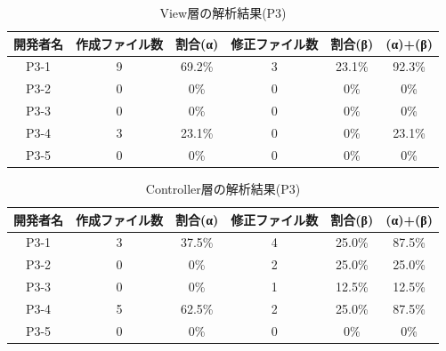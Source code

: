 \documentclass{funthesis}
\begin{document}
\begin{table}[H]
  \begin{center}
\begin{tabular}{|c|c|c|c|c||c|}\hline
開発者名&作成ファイル数&割合(α)&修正ファイル数&割合(β)&(α)+(β)\\ \hline
P3-1 & 9 & 69.2\% & 3 & 23.1\% & 92.3\%\\ \hline \hline
P3-2 & 0 & 0\% & 0 & 0\% & 0\%\\ \hline \hline
P3-3 & 0 & 0\% & 0 & 0\% & 0\%\\ \hline \hline
P3-4 & 3 & 23.1\% & 0 & 0\% & 23.1\%\\ \hline \hline
P3-5 & 0 & 0\% & 0 & 0\% & 0\%\\ \hline
\end{tabular}    
\caption{View層の解析結果(P3)}    \label{sample}
  \end{center}
\end{table}\begin{table}[H]
  \begin{center}
\begin{tabular}{|c|c|c|c|c||c|}\hline
開発者名&作成ファイル数&割合(α)&修正ファイル数&割合(β)&(α)+(β)\\ \hline
P3-1 & 3 & 37.5\% & 4 & 25.0\% & 87.5\%\\ \hline \hline
P3-2 & 0 & 0\% & 2 & 25.0\% & 25.0\%\\ \hline \hline
P3-3 & 0 & 0\% & 1 & 12.5\% & 12.5\%\\ \hline \hline
P3-4 & 5 & 62.5\% & 2 & 25.0\% & 87.5\%\\ \hline \hline
P3-5 & 0 & 0\% & 0 & 0\% & 0\%\\ \hline 
\end{tabular}    
\caption{Controller層の解析結果(P3)}    \label{sample}
  \end{center}
\end{table}
\end{document}
